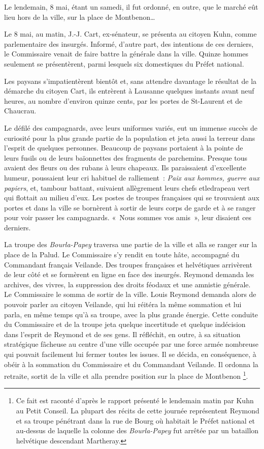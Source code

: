 \documentclass[french,twoside]{book} %
\begin{document}
\noindent Le lendemain, 8 mai, étant un samedi, il fut ordonné, en outre, que le marché eût lieu hors de la ville, sur la place de Montbenon…\par
Le 8 mai, au matin, J.-J. Cart, ex-sénateur, se présenta au citoyen Kuhn, comme parlementaire des insurgés. Informé, d’autre part, des intentions de ces derniers, le Commissaire venait de faire battre la générale dans la ville. Quinze hommes seulement se présentèrent, parmi lesquels six domestiques du Préfet national.\par
Les paysans s’impatientèrent bientôt et, sans attendre davantage le résultat de la démarche du citoyen Cart, ils entrèrent à Lausanne quelques instants avant neuf heures, au nombre d’environ quinze cents, par les portes de St-Laurent et de Chaucrau.\par
Le défilé des campagnards, avec leurs uniformes variés, eut un immense succès de curiosité pour la plus grande partie de la population et jeta aussi la terreur dans l’esprit de quelques personnes. Beaucoup de paysans portaient à la pointe de leurs fusils ou de leurs baïonnettes des fragments de parchemins. Presque tous avaient des fleurs ou des rubans à leurs chapeaux. Ils paraissaient d’excellente humeur, poussaient leur cri habituel de ralliement : \emph{Paix aux hommes, guerre aux papiers}, et, tambour battant, suivaient allègrement leurs chefs etledrapeau vert qui flottait au milieu d’eux. Les postes de troupes françaises qui se trouvaient aux portes et dans la ville se bornèrent à sortir de leurs corps de garde et à se ranger pour voir passer les campagnards. « Nous sommes vos amis », leur disaient ces derniers.\par
La troupe des \emph{Bourla-Papey} traversa une partie de la ville et alla se ranger sur la place de la Palud. Le Commissaire s’y rendit en toute hâte, accompagné du Commandant français Veilande. Des troupes françaises et helvétiques arrivèrent de leur côté et se formèrent en ligne en face des insurgés. Reymond demanda les archives, des vivres, la suppression des droits féodaux et une amnistie générale. Le Commissaire le somma de sortir de la ville. Louis Reymond demanda alors de pouvoir parler au citoyen Veilande, qui lui réitéra la même sommation et lui parla, en même temps qu’à sa troupe, avec la plus grande énergie. Cette conduite du Commissaire et de la troupe jeta quelque incertitude et quelque indécision dans l’esprit de Reymond et de ses gens. Il réfléchit, en outre, à sa situation stratégique fâcheuse au centre d’une ville occupée par une force armée nombreuse qui pouvait facilement lui fermer toutes les issues. Il se décida, en conséquence, à obéir à la sommation du Commissaire et du Commandant Veilande. Il ordonna la retraite, sortit de la ville et alla prendre position sur la place de Montbenon \footnote{Ce fait est raconté d’après le rapport présenté le lendemain matin par Kuhn au Petit Conseil. La plupart des récits de cette journée représentent Reymond et sa troupe pénétrant dans la rue de Bourg où habitait le Préfet national et au-dessus de laquelle la colonne des \emph{Bourla-Papey} fut arrêtée par un bataillon helvétique descendant Martheray.}.\par
\end{document}

